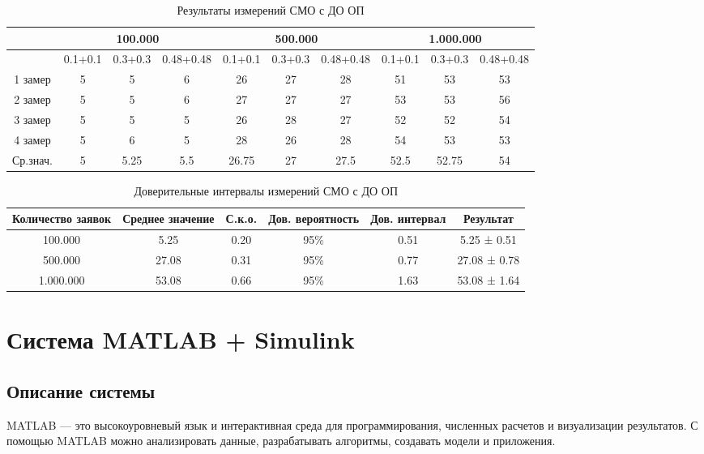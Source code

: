 \documentclass[a4paper,14pt]{report} %
\begin{document}
\begin{table}[h!]
\caption{Результаты измерений СМО с ДО ОП}
\begin{tabular}{|c|c|c|c|c|c|c|c|c|c|}
\hline
 & \multicolumn{3}{|c|}{100.000} & \multicolumn{3}{|c|}{500.000} & \multicolumn{3}{|c|}{1.000.000} \\
\hline
 & 0.1+0.1 & 0.3+0.3 & 0.48+0.48 & 0.1+0.1 & 0.3+0.3 & 0.48+0.48 & 0.1+0.1 & 0.3+0.3 & 0.48+0.48 \\
\hline
1 замер &  5 & 5 & 6 & 26 & 27 & 28 & 51 & 53 & 53    \\
\hline
2 замер &  5 & 5 & 6 & 27 & 27 & 27 & 53 & 53 & 56 \\
\hline
3 замер &   5 & 5 & 5 & 26 & 28 & 27 & 52 & 52 & 54  \\
\hline
4 замер &  5 & 6 & 5 & 28 & 26 & 28 & 54 & 53 & 53 \\
\hline
Ср.знач. &  5 & 5.25 & 5.5 & 26.75 & 27 & 27.5 & 52.5 & 52.75 & 54  \\
\hline
\end{tabular}
\end{table} 

\begin{table}[h!]
\caption{Доверительные интервалы измерений СМО с ДО ОП}
\begin{tabular}{|c|c|c|c|c|c|}
\hline
 Количество заявок & Среднее значение & С.к.о. & Дов. вероятность & Дов. интервал & Результат\\
\hline
100.000 & 5.25 & 0.20 & 95\% & 0.51 & 5.25 ± 0.51 \\
\hline
500.000 & 27.08 & 0.31 & 95\% & 0.77 & 27.08 ± 0.78 \\
\hline
1.000.000 & 53.08  & 0.66 & 95\% & 1.63 & 53.08 ± 1.64 \\
\hline
\end{tabular}
\end{table} 

\section{Система MATLAB + Simulink}
\subsection{Описание системы }
MATLAB — это высокоуровневый язык и интерактивная среда для программирования, численных расчетов и визуализации результатов. С помощью MATLAB можно анализировать данные, разрабатывать алгоритмы, создавать модели и приложения. 
\end{document}
